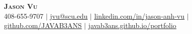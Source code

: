 \begin{center}
    \textbf{\Huge \scshape Jason Vu} \\ \vspace{1pt}
    \small 408-655-9707 $|$ \href{mailto:jvu@scu.edu}{\underline{jvu@scu.edu}} $|$ 
    \href{https://linkedin.com/in/jason-anh-vu}{\underline{linkedin.com/in/jason-anh-vu}} $|$
    \href{https://github.com/javab3ans}{\underline{github.com/JAVAB3ANS}} $|$
    \href{https://javab3ans.github.io/portfolio}{\underline{javab3ans.github.io/portfolio}}
\end{center} 